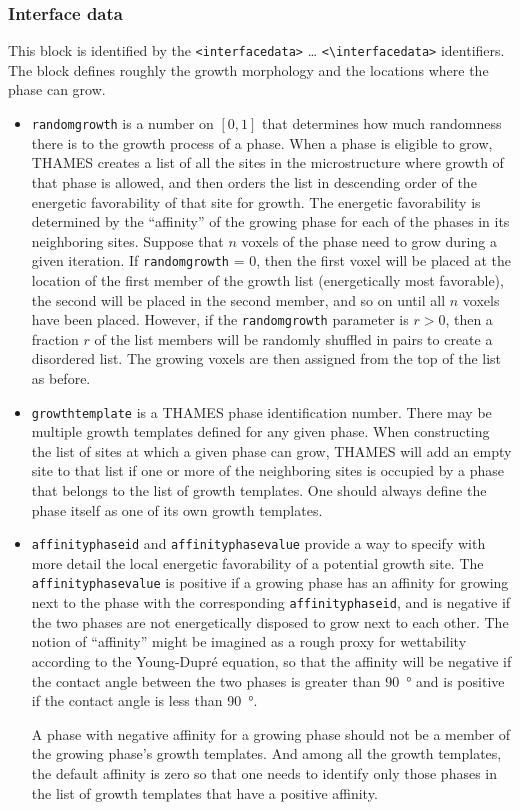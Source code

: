 \documentclass{article}
\begin{document}
\subsubsection{Interface data}
This block is identified by the \verb!<interfacedata>! \ldots
\verb!<\interfacedata>! identifiers.  The block defines roughly
the growth morphology and the locations where the phase can grow.
\begin{itemize}
	\item \texttt{randomgrowth} is a number on $\left[ 0,1 \right]$ that determines
	how much randomness there is to the
	growth process of a phase.  When a phase is eligible to grow, THAMES creates
	a list of all the sites in the microstructure where growth of that phase is
	allowed, and then orders the list in descending order of the energetic
	favorability of that site for growth.  The energetic favorability is
	determined by the ``affinity'' of the growing phase for each of the phases
	in its neighboring sites.  Suppose that $n$ voxels of the phase need to
	grow during a given iteration.  If \texttt{randomgrowth} = 0, then the first
	voxel will be placed at the location of the first member of the growth list
	(energetically most favorable), the second will be placed in the second
	member, and so on until all $n$ voxels have been placed.  However,
	if the \texttt{randomgrowth} parameter is $r > 0$, then a fraction $r$
	of the list members will be randomly shuffled in pairs to create a
	disordered list.  The growing voxels are then assigned from the top of the
	list as before.
	\item \texttt{growthtemplate} is a THAMES phase identification number. 
	There may be multiple growth templates defined for any given phase. When
	constructing the list of sites at which a given phase can grow, THAMES will
	add an empty site to that list if one or more of the neighboring sites is
	occupied by a phase that belongs to the list of growth templates.  One
	should always define the phase itself as one of its own growth templates.
	\item \texttt{affinityphaseid} and \texttt{affinityphasevalue} provide a
	way to specify with more detail the local energetic favorability of
	a potential growth site.  The \texttt{affinityphasevalue} is positive
	if a growing phase has an affinity for growing next to the phase with
	the corresponding \texttt{affinityphaseid}, and is negative if the two
	phases are not energetically disposed to grow next to each other.  The
	notion of ``affinity'' might be imagined as a rough proxy for wettability according
	to the Young-Dupr{\'{e}} equation, so that the affinity will be negative
	if the contact angle between the two phases is greater than \SI{90}{\degree}
	and is positive if the contact angle is less than \SI{90}{\degree}.
	
	A phase with negative affinity for a growing phase should not be
	a member of the growing phase's growth templates.  And among all the
	growth templates, the default affinity is zero so that one needs to
	identify only those phases in the list of growth templates that have
	a positive affinity.
\end{itemize}
\end{document}
